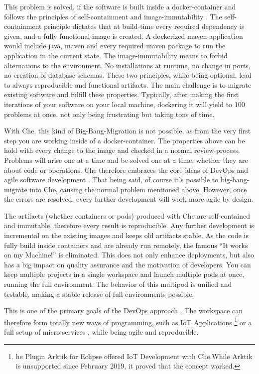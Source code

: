 \documentclass[utf8]{lni}
\begin{document}
This problem is solved, if the software is built inside a docker-container and follows the principles of self-containment and image-immutability \cite{BI17}.
The self-containment principle dictates that  at build-time every required dependency is given, and a fully functional image is created.
A dockerized maven-application would include java, maven and every required maven package to run the application in the current state. 
The image-immutability means to forbid alternations to the environment. 
No installations at runtime, no change in ports, no creation of database-schemas.
These two principles, while being optional, lead to always reproducible and functional artifacts.
The main challenge is to migrate existing software and fulfill these properties. 
Typically, after making the first iterations of your software on your local machine, dockering it will yield to 100 problems at once, not only being frustrating but taking tons of time. 

With Che, this kind of Big-Bang-Migration is not possible, as from the very first step you are working inside of a docker-container.
The properties above can be hold with every change to the image and checked in a normal review-process. 
Problems will arise one at a time and be solved one at a time, whether they are about code or operations. 
Che therefore embraces the core-ideas of DevOps \cite{HUE12}\cite{JA16} and agile software development \cite{EBE16}.
That being said, of course it's possible to big-bang-migrate into Che, causing the normal problem mentioned above. 
However, once the errors are resolved, every further development will work more agile by design.

The artifacts (whether containers or pods) produced with Che are self-contained and immutable, therefore every result is reproducible. 
Any further development is incremental on the existing images and keeps old artifacts stable. 
As the code is fully build inside containers and are already run remotely, the famous “It works on my Machine!” is eliminated. 
This does not only enhance deployments, but also has a big impact on quality assurance and the motivation of developers. 
You can keep multiple projects in a single workspace and launch multiple pods at once, running the full environment. 
The behavior of this multipod is unified and testable, making a stable release of full environments possible. 

This is one of the primary goals of the DevOps approach \cite{JA16}. 
The workspace can therefore form totally new ways of programming, such as IoT Applications \footnote{he Plugin Arktik for Eclipse offered IoT Development with Che.While Arktik is unsupported since February 2019, it proved that the concept worked.} or a full setup of micro-services \cite{IV18}, while being agile and reproducible.
\end{document}
